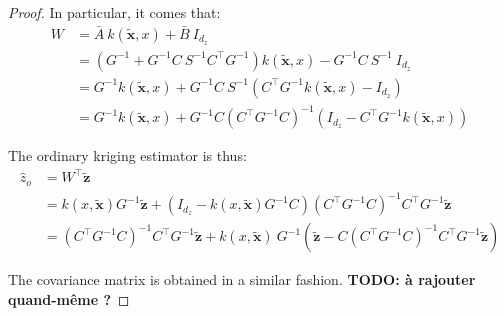 \begin{proof}
	In particular, it comes that:
	\begin{equation}
		\begin{aligned}
		W&=\bar{A}\:k(\tilde{\mathbf{x}},x)+\bar{B}\:I_{d_z}\\
		&=\left(G^{-1}+G^{-1}C\:S^{-1}C^\top G^{-1}\right)k(\tilde{\mathbf{x}},x)-G^{-1}C\:S^{-1}\:I_{d_z}\\
		&=G^{-1}k(\tilde{\mathbf{x}},x)+G^{-1}C\:S^{-1}\left(C^\top G^{-1}k(\tilde{\mathbf{x}},x)-I_{d_z}\right)\\
		&=G^{-1}k(\tilde{\mathbf{x}},x)+G^{-1}C\left(C^\top G^{-1}C\right)^{-1}\left(I_{d_z}-C^\top G^{-1}k(\tilde{\mathbf{x}},x)\right)
		\end{aligned}
	\end{equation}

	The ordinary kriging estimator is thus:
	\begin{equation}
		\begin{aligned}
		\hat{z}_o&=W^\top\tilde{\mathbf{z}}\\
		&=k(x,\tilde{\mathbf{x}})G^{-1}\tilde{\mathbf{z}}+\left(I_{d_z}-k(x,\tilde{\mathbf{x}})G^{-1}C\right)\left(C^\top G^{-1}C\right)^{-1}C^\top G^{-1}\tilde{\mathbf{z}}\\
		&=\left(C^\top G^{-1}C\right)^{-1}C^\top G^{-1}\tilde{\mathbf{z}}+k(x,\tilde{\mathbf{x}})\:G^{-1}\left(\tilde{\mathbf{z}}-C\left(C^\top G^{-1}C\right)^{-1}C^\top G^{-1}\tilde{\mathbf{z}}\right)
		\end{aligned}
	\end{equation}

	The covariance matrix is obtained in a similar fashion. \textbf{TODO: à rajouter quand-même ?}
\end{proof}

